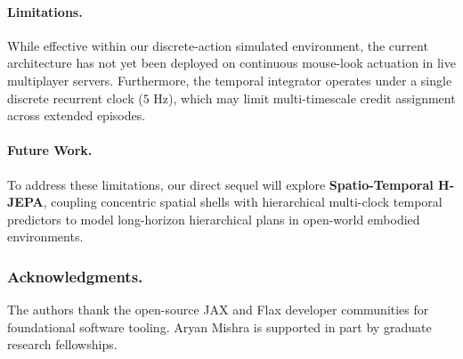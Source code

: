 \documentclass{svproc}
\begin{document}
\paragraph{Limitations.} While effective within our discrete-action simulated environment, the current architecture has not yet been deployed on continuous mouse-look actuation in live multiplayer servers. Furthermore, the temporal integrator operates under a single discrete recurrent clock ($5\text{ Hz}$), which may limit multi-timescale credit assignment across extended episodes.

\paragraph{Future Work.} To address these limitations, our direct sequel will explore \textbf{Spatio-Temporal H-JEPA}, coupling concentric spatial shells with hierarchical multi-clock temporal predictors to model long-horizon hierarchical plans in open-world embodied environments.

\subsubsection*{Acknowledgments.}
The authors thank the open-source JAX and Flax developer communities for foundational software tooling. Aryan Mishra is supported in part by graduate research fellowships.



\end{document}
